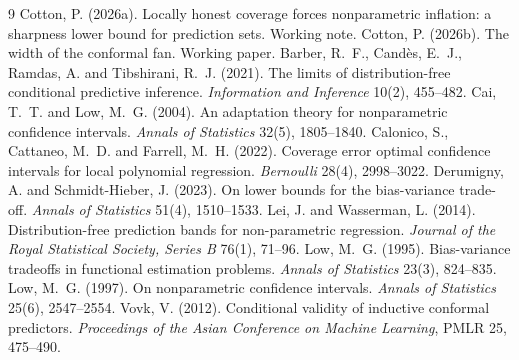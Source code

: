 \documentclass[11pt]{article}
\theoremstyle{definition}
\theoremstyle{remark}
\begin{document}
\begin{thebibliography}{9}
 Cotton, P. (2026a). Locally honest coverage forces
  nonparametric inflation: a sharpness lower bound for prediction sets. Working note.
 Cotton, P. (2026b). The width of the conformal fan.
  Working paper.
 Barber, R.~F., Cand\`es, E.~J., Ramdas, A.
  and Tibshirani, R.~J. (2021). The limits of distribution-free conditional predictive
  inference. \emph{Information and Inference} 10(2), 455--482.
 Cai, T.~T. and Low, M.~G. (2004). An
  adaptation theory for nonparametric confidence intervals. \emph{Annals of Statistics}
  32(5), 1805--1840.
 Calonico, S., Cattaneo, M.~D. and
  Farrell, M.~H. (2022). Coverage error optimal confidence intervals for local polynomial
  regression. \emph{Bernoulli} 28(4), 2998--3022.
 Derumigny, A. and
  Schmidt-Hieber, J. (2023). On lower bounds for the bias-variance trade-off. \emph{Annals
  of Statistics} 51(4), 1510--1533.
 Lei, J. and Wasserman, L. (2014).
  Distribution-free prediction bands for non-parametric regression. \emph{Journal of the
  Royal Statistical Society, Series B} 76(1), 71--96.
 Low, M.~G. (1995). Bias-variance tradeoffs in functional
  estimation problems. \emph{Annals of Statistics} 23(3), 824--835.
 Low, M.~G. (1997). On nonparametric confidence
  intervals. \emph{Annals of Statistics} 25(6), 2547--2554.
 Vovk, V. (2012). Conditional validity of
  inductive conformal predictors. \emph{Proceedings of the Asian Conference on Machine
  Learning}, PMLR 25, 475--490.
\end{thebibliography}
\end{document}
